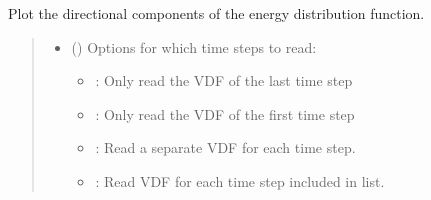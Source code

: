 \documentclass[letterpaper,10pt,english,openany,oneside]{sphinxmanual}
\begin{document}
\begin{fulllineitems}
\begin{fulllineitems}
\label{\detokenize{api/pytb.ThunderBoltz.plot_edf_comps:pytb.ThunderBoltz.plot_edf_comps}}
\pysigstartsignatures
{}
\pysigstopsignatures
\sphinxAtStartPar
Plot the directional components of the energy distribution function.
\begin{quote}\begin{description}
\begin{itemize}
\item {} 
\sphinxAtStartPar
{} (\sphinxstyleliteralemphasis{\sphinxupquote{, }}\sphinxstyleliteralemphasis{\sphinxupquote{{[}}}\sphinxstyleliteralemphasis{\sphinxupquote{{]}}}) \textendash{} 
\sphinxAtStartPar
Options for which time steps to
read:
\begin{itemize}
\item {} 
\sphinxAtStartPar
{}: Only read the VDF of the last time step

\item {} 
\sphinxAtStartPar
{}: Only read the VDF of the first time step

\item {} 
\sphinxAtStartPar
{}: Read a separate VDF for each time step.

\item {} 
\sphinxAtStartPar
{}: Read VDF for each time step included in list.


\end{itemize}
\end{itemize}
\end{description}
\end{quote}
\end{fulllineitems}
\end{fulllineitems}
\end{document}
